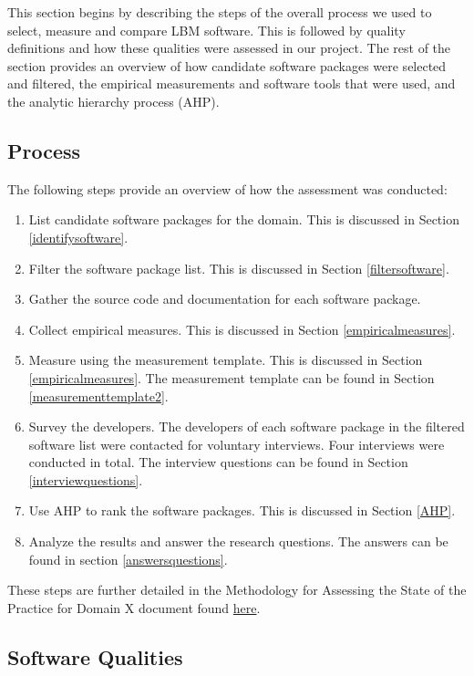 \documentclass[12pt, notitlepage]{article}
\begin{document}
This section begins by describing the steps of the overall process we used to select, measure and compare LBM software. This is followed by quality definitions and how these qualities were assessed in our project. The rest of the section provides an overview of how candidate software packages were selected and filtered, the empirical measurements and software tools that were used, and the analytic hierarchy process (AHP). 

\subsection{Process}

 The following steps provide an overview of how the assessment was conducted: 

\begin{enumerate}
	\item List candidate software packages for the domain. This is discussed in Section \ref{identifysoftware}.
	\item Filter the software package list. This is discussed in Section \ref{filtersoftware}.
	\item Gather the source code and documentation for each software package.
	\item Collect empirical measures. This is discussed in Section \ref{empiricalmeasures}.
	\item Measure using the measurement template. This is discussed in Section \ref{empiricalmeasures}. The measurement template can be found in Section \ref{measurementtemplate2}.
	\item Survey the developers. The developers of each software package in the filtered software list were contacted for voluntary interviews. Four interviews were conducted in total. The interview questions can be found in Section \ref{interviewquestions}.
	\item Use AHP to rank the software packages. This is discussed in Section \ref{AHP}.
	\item Analyze the results and answer the research questions. The answers can be found in section \ref{answersquestions}.
\end{enumerate}

These steps are further detailed in the Methodology for Assessing the State of the Practice for Domain X document found \href{https://github.com/smiths/AIMSS/blob/master/StateOfPractice/Methodology/Methodology.pdf}{here}. 

\subsection{Software Qualities}\label{softwarequalities}
\end{document}
